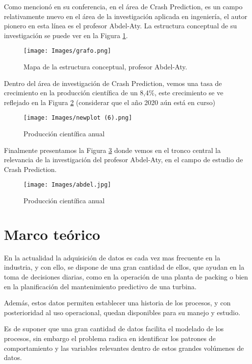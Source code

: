 \documentclass{article}
\begin{document}
Como mencionó en su conferencia, en el área de Crash Prediction, es un campo relativamente nuevo en el área de la investigación aplicada en ingeniería, el autor pionero en esta línea es el profesor Abdel-Aty. La estructura conceptual de su investigación se puede ver en la Figura \ref{aty}.

\begin{figure}[H]
\texttt{[image: Images/grafo.png]}
\centering
\caption{Mapa de la estructura conceptual, profesor Abdel-Aty.}
\label{aty}
\end{figure}

Dentro del área de investigación de Crash Prediction, vemos una tasa de crecimiento en la producción científica de un 8,4\%, este crecimiento se ve reflejado en la Figura \ref{prod} (considerar que el año 2020 aún está  en curso)

\begin{figure}[H]
\texttt{[image: Images/newplot (6).png]}
\centering
\caption{Producción científica anual}
\label{prod}
\end{figure}

Finalmente presentamos la Figura \ref{arbol} donde vemos en el tronco central la relevancia de la investigación del profesor Abdel-Aty, en el campo de estudio de Crash Prediction.

\begin{figure}[H]
\texttt{[image: Images/abdel.jpg]}
\centering
\caption{Producción científica anual}
\label{arbol}
\end{figure}



\section{Marco teórico}

En la actualidad la adquisición de datos es cada vez mas frecuente en la industria, y con ello, se dispone de una gran cantidad de ellos, que ayudan en la toma de decisiones diarias, como en la operación de  una planta de packing o bien en la planificación del mantenimiento predictivo de una turbina.

Además, estos datos permiten establecer una historia de los procesos, y con posterioridad al uso operacional, quedan disponibles para su manejo y estudio.

Es de suponer que una gran cantidad de datos facilita el modelado de los procesos, sin embargo el problema radica en identificar los patrones de comportamiento y las variables relevantes dentro de estos grandes volúmenes de datos.
\end{document}
